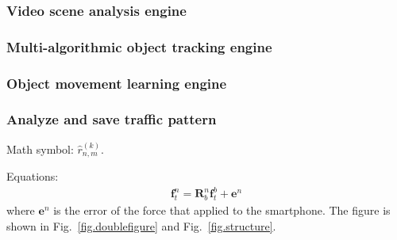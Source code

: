 \documentclass[conference]{IEEEtran}
\def\figref#1{Fig.~\ref{#1}}
\begin{document}
\subsubsection{Video scene analysis engine}


\subsubsection{Multi-algorithmic object tracking engine}

\subsubsection{Object movement learning engine}

\subsubsection{Analyze and save traffic pattern}


Math symbol: $\hat{r}_{n,m}^{(k)}$.

Equations:
\begin{align}
\mathbf{f}_t^n=\mathbf{R}_b^n \mathbf{f}_t^b + \mathbf{e}^n
\end{align}
where $\mathbf{e}^n$ is the error of the force that applied to the smartphone. The figure is shown in \figref{fig.doublefigure} and \figref{fig.structure}.

\end{document}
